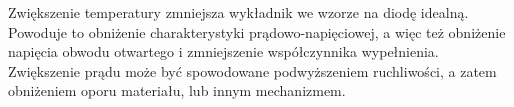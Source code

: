 \documentclass[a4, 12pt]{article}
\begin{document}
	Zwiększenie temperatury zmniejsza wykładnik we wzorze na diodę idealną. Powoduje to obniżenie charakterystyki prądowo-napięciowej, a więc też obniżenie napięcia obwodu otwartego i zmniejszenie współczynnika wypełnienia. Zwiększenie prądu może być spowodowane podwyższeniem ruchliwości, a zatem obniżeniem oporu materiału, lub innym mechanizmem. 
\end{document}

